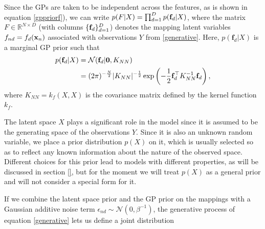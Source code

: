 

\par Since the GPs are taken to be independent across the features, as is shown in equation \eqref{gppriorf}), we can write 
$p(F | X) = \prod_{d=1}^D p(\mathbf{f}_d | X)$, where the matrix $F \in \mathbb{R}^{N \times D}$ (with columns
$\{ \mathbf{f}_d \}_{d=1}^D$) denotes the mapping latent variables \ $f_{nd} =f_d(\mathbf{x}_n)$
associated with observations $Y$ from \eqref{generative}. 
Here,
$p(\mathbf{f}_d | \mathit{X})$ is a marginal GP prior 
such that 
\begin{align}
p(\mathbf{f}_d | X) &= \mathcal{N}(\mathbf{f}_d |\mathbf{0}, K_{NN}) \nonumber \\
                     &= (2 \pi)^{-\frac{N}{2}} \vert K_{NN} \vert^{-\frac{1}{2}} 
                        \exp \left( - \frac{1}{2} \mathbf{f}_d^{\top} K_{NN}^{-1} \mathbf{f}_d \right) , \label{priorF}
\end{align}
where $\mathit{K}_{NN}= \mathit{k}_f(X,X)$ is the covariance matrix
defined by the kernel function $\mathit{k}_f$.

The latent space $X$ plays a significant role in the model since it is
assumed to be the generating space of the observations $Y$. 
Since it is also an unknown random variable, we place a prior distribution $p(X)$ on it, which is
usually selected so as to reflect any known information about the nature of the observed space. Different choices for
this prior lead to models with different properties, as will be discussed in section \ref{}, but for the moment
we will treat $p(X)$ as a general prior and will not consider a special form for it.


If we combine the latent space prior and the GP prior on the mappings with a Gaussian
additive noise term $\epsilon_{nd} \sim \mathcal{N}(0, \beta^{-1})$, the generative process of
equation \eqref{generative} lets us define a joint distribution

